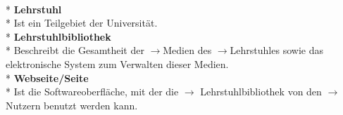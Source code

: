 \documentclass[12pt, a4paper]{article}
\begin{document}
\\*
\textbf{Lehrstuhl}
\\*
Ist ein Teilgebiet der Universität.
\\*
\textbf{Lehrstuhlbibliothek}
\\*
Beschreibt die Gesamtheit der $\rightarrow$Medien des $\rightarrow$Lehrstuhles sowie das elektronische System zum Verwalten dieser Medien.
\\*
\textbf{Webseite/Seite}
\\*
Ist die Softwareoberfläche, mit der die $\rightarrow$ Lehrstuhlbibliothek von den $\rightarrow$ Nutzern benutzt werden kann.
\pagebreak
\end{document}
